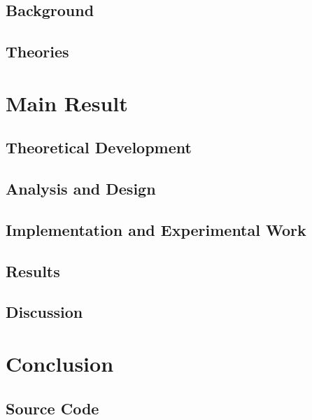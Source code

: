 \documentclass[11pt,a4paper]{report}
\begin{document}
		\section{Background}
		\section{Theories}
	
	\chapter{Main Result}
		\section{Theoretical Development}
		\section{Analysis and Design}
		\section{Implementation and Experimental Work}
		\section{Results}
		\section{Discussion}
		
	\chapter{Conclusion}
	
	
	
	\nocite{*}
	
	\begin{appendices}
		\chapter{Source Code}
	\end{appendices}
\end{document}
